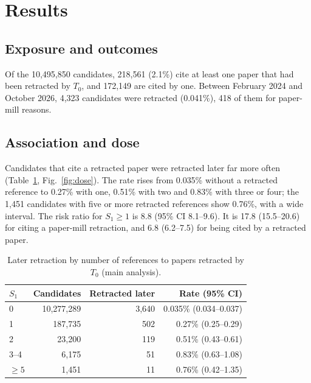 \section{Results}\label{sec:results}

\subsection{Exposure and outcomes}
Of the 10,495,850 candidates, 218,561 (2.1\%) cite at least one paper that had been retracted by $T_0$, and 172,149
are cited by one. Between February 2024 and October 2026, 4,323 candidates were retracted (0.041\%), 418 of them for
paper-mill reasons.

\subsection{Association and dose}
Candidates that cite a retracted paper were retracted later far more often (Table~\ref{tab:dose}, Fig.~\ref{fig:dose}). The rate rises from
0.035\% without a retracted reference to 0.27\% with one, 0.51\% with two and 0.83\% with three or four; the
1,451 candidates with five or more retracted references show 0.76\%, with a wide interval. The risk ratio for
$S_1 \ge 1$ is 8.8 (95\% CI 8.1--9.6). It is 17.8 (15.5--20.6) for citing a paper-mill retraction, and 6.8
(6.2--7.5) for being cited by a retracted paper.

\begin{table}[t]
\centering
\caption{Later retraction by number of references to papers retracted by $T_0$ (main analysis).}\label{tab:dose}
\begin{tabular}{lrrr}
\toprule
$S_1$ & Candidates & Retracted later & Rate (95\% CI) \\
\midrule
0 & 10,277,289 & 3,640 & 0.035\% (0.034--0.037) \\
1 & 187,735 & 502 & 0.27\% (0.25--0.29) \\
2 & 23,200 & 119 & 0.51\% (0.43--0.61) \\
3--4 & 6,175 & 51 & 0.83\% (0.63--1.08) \\
$\ge 5$ & 1,451 & 11 & 0.76\% (0.42--1.35) \\
\bottomrule
\end{tabular}
\end{table}

